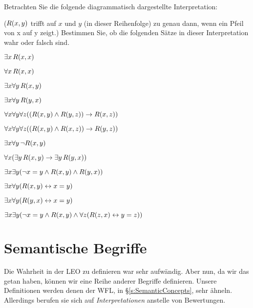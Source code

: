 \problempart
\label{pr.TorF3}
Betrachten Sie die folgende diagrammatisch dargestellte Interpretation:
\begin{center}
\end{center}
($\mathord{R}(x,y)$ trifft auf $x$ und $y$ (in dieser Reihenfolge) zu genau dann, wenn ein Pfeil von x auf y zeigt.) Bestimmen Sie, ob die folgenden Sätze in dieser Interpretation wahr oder falsch sind.
\begin{earg}
\item $\exists x\, \mathord{R}(x,x)$
\item $\forall x\, \mathord{R}(x,x)$
\item $\exists x \forall y\, \mathord{R}(x,y)$
\item $\exists x \forall y\, \mathord{R}(y,x)$
\item $\forall x \forall y \forall z ((\mathord{R}(x,y) \wedge \mathord{R}(y,z)) \rightarrow \mathord{R}(x,z))$
\item $\forall x \forall y \forall z ((\mathord{R}(x,y) \wedge \mathord{R}(x,z)) \rightarrow \mathord{R}(y,z))$
\item $\exists x \forall y\, \neg \mathord{R}(x,y)$
\item $\forall x(\exists y\, \mathord{R}(x,y) \rightarrow \exists y\, \mathord{R}(y,x))$
\item $\exists x \exists y (\neg x = y \wedge \mathord{R}(x,y) \wedge \mathord{R}(y,x))$
\item $\exists x \forall y(\mathord{R}(x,y) \leftrightarrow x = y)$
\item $\exists x \forall y(\mathord{R}(y,x) \leftrightarrow x = y)$
\item $\exists x \exists y(\neg x = y \wedge \mathord{R}(x,y) \wedge \forall z(\mathord{R}(z,x) \leftrightarrow y = z))$
\end{earg}


\chapter{Semantische Begriffe}

Die Wahrheit in der LEO zu definieren war sehr aufwändig. Aber nun, da wir das getan haben, können wir eine Reihe anderer Begriffe definieren. Unsere Definitionen werden denen der WFL, in \S\ref{s:SemanticConcepts}, sehr ähneln. Allerdings berufen sie sich auf \emph{Interpretationen} anstelle von Bewertungen. 

